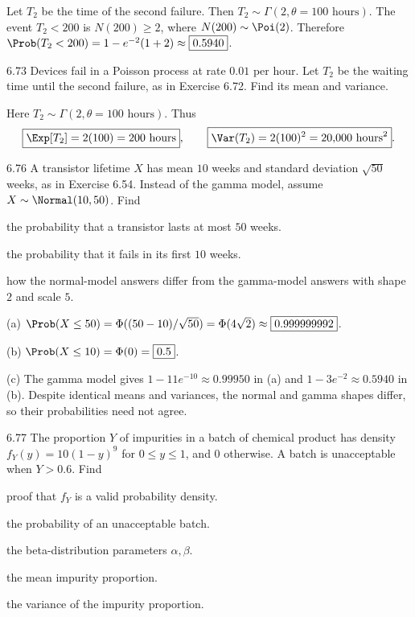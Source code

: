\documentclass[11pt,oneside]{article}
\begin{document}
\begin{solution}
Let $T_2$ be the time of the second failure. Then $T_2\sim\Gamma(2,\theta=100\text{ hours})$. The event $T_2<200$ is $N(200)\ge2$, where $N(200)\sim\Poi(2)$. Therefore $\Prob(T_2<200)=1-e^{-2}(1+2)\approx\boxed{0.5940}$.
\end{solution}

\begin{exercise}{6.73}
Devices fail in a Poisson process at rate $0.01$ per hour. Let $T_2$ be the waiting time until the second failure, as in Exercise 6.72. Find its mean and variance.
\end{exercise}

\begin{solution}
Here $T_2\sim\Gamma(2,\theta=100\text{ hours})$. Thus
\[
\boxed{\Exp[T_2]=2(100)=200\text{ hours}},\qquad
\boxed{\Var(T_2)=2(100)^2=20{,}000\text{ hours}^2}.
\]
\end{solution}

\begin{exercise}{6.76}
A transistor lifetime $X$ has mean $10$ weeks and standard deviation $\sqrt{50}$ weeks, as in Exercise 6.54. Instead of the gamma model, assume $X\sim\Normal(10,50)$. Find
\begin{exercisesubparts}
\item the probability that a transistor lasts at most $50$ weeks.
\item the probability that it fails in its first $10$ weeks.
\item how the normal-model answers differ from the gamma-model answers with shape $2$ and scale $5$.
\end{exercisesubparts}
\end{exercise}

\begin{solution}
\noindent\textup{(a)} $\Prob(X\le50)=\Phi((50-10)/\sqrt{50})=\Phi(4\sqrt2)\approx\boxed{0.999999992}$.

\noindent\textup{(b)} $\Prob(X\le10)=\Phi(0)=\boxed{0.5}$.

\noindent\textup{(c)} The gamma model gives $1-11e^{-10}\approx0.99950$ in (a) and $1-3e^{-2}\approx0.5940$ in (b). Despite identical means and variances, the normal and gamma shapes differ, so their probabilities need not agree.
\end{solution}

\begin{exercise}{6.77}
The proportion $Y$ of impurities in a batch of chemical product has density $f_Y(y)=10(1-y)^9$ for $0\le y\le1$, and $0$ otherwise. A batch is unacceptable when $Y>0.6$. Find
\begin{exercisesubparts}
\item proof that $f_Y$ is a valid probability density.
\item the probability of an unacceptable batch.
\item the beta-distribution parameters $\alpha,\beta$.
\item the mean impurity proportion.
\item the variance of the impurity proportion.
\end{exercisesubparts}
\end{exercise}
\end{document}
